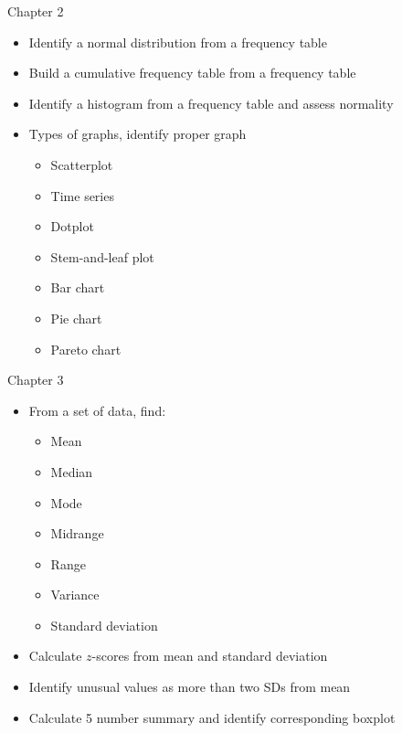 \documentclass[xcolor=table]{beamer}
\begin{document}
\begin{frame}{Chapter 2}
\begin{block}{}
\begin{itemize}
\item Identify a normal distribution from a frequency table
\item Build a cumulative frequency table from a frequency table
\item Identify a histogram from a frequency table and assess normality
\item Types of graphs, identify proper graph
\begin{itemize}
\item Scatterplot
\item Time series
\item Dotplot
\item Stem-and-leaf plot
\item Bar chart
\item Pie chart
\item Pareto chart
\end{itemize}
\end{itemize}
\end{block}
\end{frame}

\begin{frame}{Chapter 3}
\begin{block}{}
\begin{itemize}
\item From a set of data, find:
\begin{itemize}
\item Mean
\item Median
\item Mode
\item Midrange
\item Range
\item Variance
\item Standard deviation
\end{itemize}
\item Calculate $z$-scores from mean and standard deviation
\item Identify unusual values as more than two SDs from mean
\item Calculate 5 number summary and identify corresponding boxplot
\end{itemize}
\end{block}
\end{frame}
\end{document}
